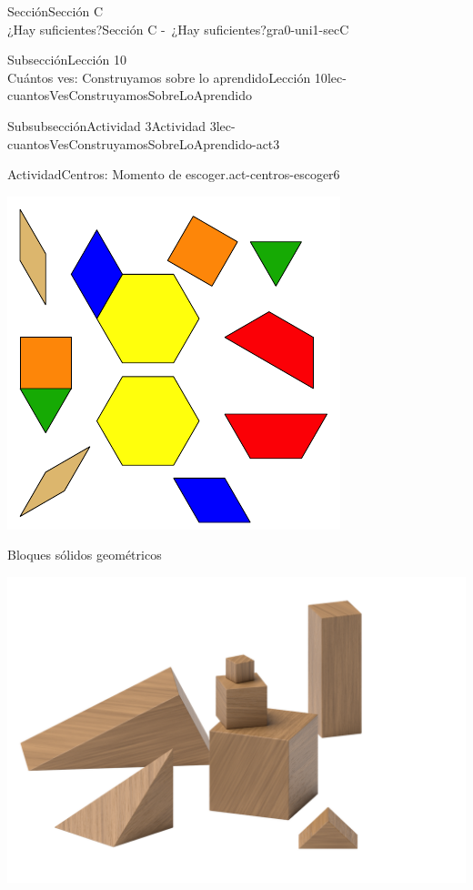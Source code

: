 \begin{sectionptx}{Sección}{{\Large Sección C\\}¿Hay suficientes?}{}{Sección C -~¿Hay suficientes?}{}{}{gra0-uni1-secC}
\begin{subsectionptx}{Subsección}{{\normalsize Lección 10\\[-0.05cm]}Cuántos ves: Construyamos sobre lo aprendido}{}{Lección 10}{}{}{lec-cuantosVesConstruyamosSobreLoAprendido}
\begin{subsubsectionptx}{Subsubsección}{Actividad 3}{}{Actividad 3}{}{}{lec-cuantosVesConstruyamosSobreLoAprendido-act3}
\begin{activity}{Actividad}{Centros: Momento de escoger.}{act-centros-escoger6}
\begin{sidebyside}{2}{0.025}{0.025}{0.05}
\begin{sbspanel}{0.45}
\includegraphics[max width=\linewidth, center]{external/svg-source/tikz-file-147344.pdf}
\end{sbspanel}%
\end{sidebyside}%
\vspace*{1ex minus 0.8ex}
\begin{sidebyside}{2}{0.025}{0.025}{0.05}%
\begin{sbspanel}{0.45}%
Bloques sólidos geométricos%
\par
\includegraphics[max width=\linewidth, center]{external/png-source/K.1.A Beta Student Workbook.Geoblocks.png}

\end{sbspanel}
\end{sidebyside}
\end{activity}
\end{subsubsectionptx}
\end{subsectionptx}
\end{sectionptx}
